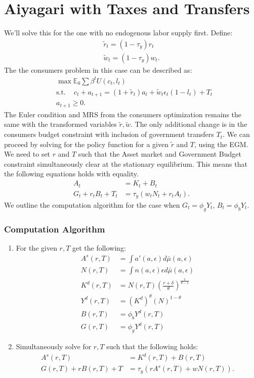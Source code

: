 \documentclass[12pt]{article}
\begin{document}
%

\section{Aiyagari with Taxes and Transfers}
We'll solve this for the one with no endogenous labor supply first. Define:
\begin{align*}
\tilde{r}_t = (1-\tau_y)r_t \\
\tilde{w}_t = (1-\tau_y)w_t.
\end{align*}
The the consumers problem in this case can be described as:
\begin{align*}
& \max \mathbb{E}_0 \sum \beta^t U(c_t, l_t) \\
& \text{s.t.  } \;\;\; c_t + a_{t+1} = (1+\tilde{r}_t)a_t + \tilde{w}_t \epsilon_t (1-l_t) + T_t\\
& a_{t+1} \geq 0.
\end{align*}
The Euler condition and MRS from the consumers optimization remains the same with the transformed variables $\tilde{r}, \tilde{w}$. The only additional change is in the consumers budget constraint with inclusion of government transfers $T_t$. We can proceed by solving for the policy function for a given $\tilde{r}$ and $T$, using the EGM. We need to set $r$ and $T$ such that the Asset market and Government Budget constraint simultaneously clear at the stationary equilibrium. This means that the following equations holds with equality.
\begin{align*}
A_t & = K_t + B_t \\
G_t + r_tB_t + T_t & = \tau_y (w_tN_t + r_t A_t).
\end{align*}
We outline the computation algorithm for the case when $G_t = \phi_g Y_t$, $B_t = \phi_b Y_t.$

\subsubsection*{Computation Algorithm}
\begin{enumerate}
\item For the given $r, T$ get the following:
\begin{align*}
A^s(r, T) & = \int a'(a, \epsilon) d\bar{\mu}(a, \epsilon) \\
N(r, T) &= \int n(a, \epsilon)\epsilon d\bar{\mu}(a, \epsilon) \\
K^d(r, T ) &= N(r, T) (\frac{r+\delta}{\theta})^{\frac{1}{\theta-1}} \\
Y^d(r, T) & = (K^d)^{\theta}(N)^{1-\theta}\\
B(r, T) & = \phi_b Y^d(r, T) \\
G(r, T) & = \phi_g Y^d(r, T)
\end{align*}
\item Simultaneously solve for $r, T$ such that the following holds:
\begin{align*}
A^s(r, T) &= K^d(r, T) + B(r, T) \\
G(r, T) + r B(r, T) + T & = \tau_y(rA^s(r, T) + wN(r, T)).
\end{align*}
\end{enumerate}
\end{document}
